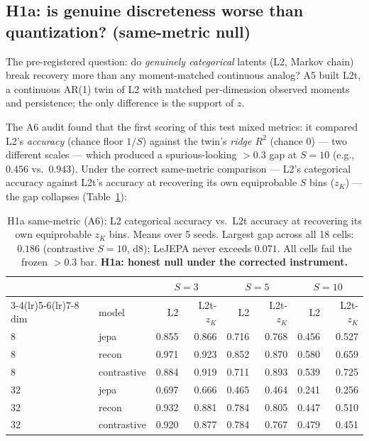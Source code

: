 \documentclass[10pt]{article}
\begin{document}
\subsection{H1a: is genuine discreteness worse than quantization? (same-metric null)}
\label{sec:h1a}
The pre-registered question: do \emph{genuinely categorical} latents (L2,
Markov chain) break recovery more than any moment-matched continuous analog?
A5 built L2t, a continuous AR(1) twin of L2 with matched per-dimension
observed moments and persistence; the only difference is the support of $z$.

The A6 audit found that the first scoring of this test mixed metrics: it
compared L2's \emph{accuracy} (chance floor $1/S$) against the twin's
\emph{ridge $R^2$} (chance 0) --- two different scales --- which produced a
spurious-looking $>0.3$ gap at $S{=}10$ (e.g., $0.456$ vs.\ $0.943$). Under the
correct same-metric comparison --- L2's categorical accuracy against L2t's
accuracy at recovering its own equiprobable $S$ bins ($z_K$) --- the gap
collapses (Table~\ref{tab:h1a}):

\begin{table}[ht]\centering\small
\begin{tabular}{@{}llrrrrrr@{}}
\toprule
 & & \multicolumn{2}{c}{$S{=}3$} & \multicolumn{2}{c}{$S{=}5$} & \multicolumn{2}{c}{$S{=}10$} \\
\cmidrule(lr){3-4}\cmidrule(lr){5-6}\cmidrule(lr){7-8}
dim & model & L2 & L2t-$z_K$ & L2 & L2t-$z_K$ & L2 & L2t-$z_K$ \\
\midrule
8 & jepa & 0.855 & 0.866 & 0.716 & 0.768 & 0.456 & 0.527 \\
8 & recon & 0.971 & 0.923 & 0.852 & 0.870 & 0.580 & 0.659 \\
8 & contrastive & 0.884 & 0.919 & 0.711 & 0.893 & 0.539 & 0.725 \\
32 & jepa & 0.697 & 0.666 & 0.465 & 0.464 & 0.241 & 0.256 \\
32 & recon & 0.932 & 0.881 & 0.784 & 0.805 & 0.447 & 0.510 \\
32 & contrastive & 0.920 & 0.877 & 0.784 & 0.767 & 0.479 & 0.451 \\
\bottomrule
\end{tabular}
\caption{H1a same-metric (A6): L2 categorical accuracy vs.\ L2t accuracy at
recovering its own equiprobable $z_K$ bins. Means over 5 seeds. Largest gap
across all 18 cells: $0.186$ (contrastive $S{=}10$, d8); LeJEPA never exceeds
$0.071$. All cells fail the frozen $>0.3$ bar. \textbf{H1a: honest null under
the corrected instrument.}}
\label{tab:h1a}
\end{table}
\end{document}
